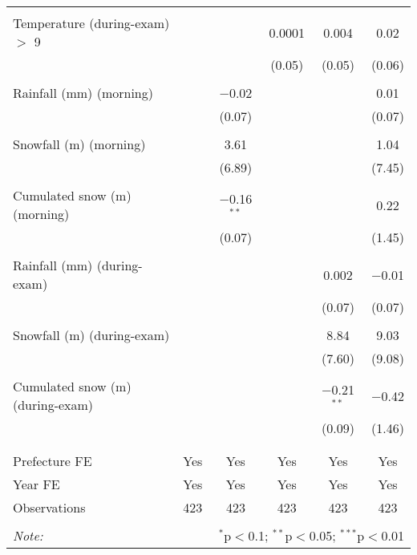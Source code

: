 \begin{tabular}{@{\extracolsep{5pt}}lccccc}
  & & & & & \\ 
 Temperature (during-exam) $>$ 9 &  &  & 0.0001 & 0.004 & 0.02 \\ 
  &  &  & (0.05) & (0.05) & (0.06) \\ 
  & & & & & \\ 
 Rainfall (mm) (morning) &  & $-$0.02 &  &  & 0.01 \\ 
  &  & (0.07) &  &  & (0.07) \\ 
  & & & & & \\ 
 Snowfall (m) (morning) &  & 3.61 &  &  & 1.04 \\ 
  &  & (6.89) &  &  & (7.45) \\ 
  & & & & & \\ 
 Cumulated snow (m) (morning) &  & $-$0.16$^{**}$ &  &  & 0.22 \\ 
  &  & (0.07) &  &  & (1.45) \\ 
  & & & & & \\ 
 Rainfall (mm) (during-exam) &  &  &  & 0.002 & $-$0.01 \\ 
  &  &  &  & (0.07) & (0.07) \\ 
  & & & & & \\ 
 Snowfall (m) (during-exam) &  &  &  & 8.84 & 9.03 \\ 
  &  &  &  & (7.60) & (9.08) \\ 
  & & & & & \\ 
 Cumulated snow (m) (during-exam) &  &  &  & $-$0.21$^{**}$ & $-$0.42 \\ 
  &  &  &  & (0.09) & (1.46) \\ 
  & & & & & \\ 
\hline \\[-1.8ex] 
Prefecture FE & Yes & Yes & Yes & Yes & Yes \\ 
Year FE & Yes & Yes & Yes & Yes & Yes \\ 
Observations & 423 & 423 & 423 & 423 & 423 \\ 
\hline 
\hline \\[-1.8ex] 
\textit{Note:}  & \multicolumn{5}{r}{$^{*}$p$<$0.1; $^{**}$p$<$0.05; $^{***}$p$<$0.01} \\ 
\end{tabular} 
